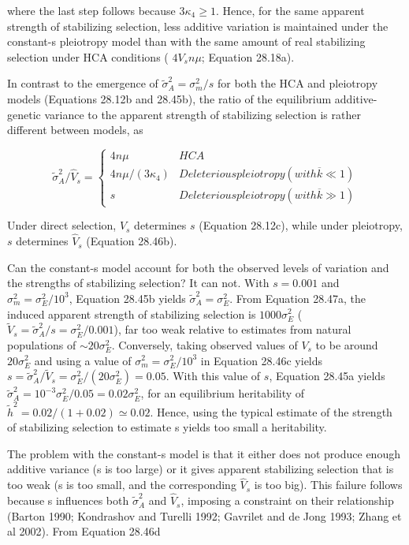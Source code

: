 \documentclass{article}
\begin{document}
where the last step follows because  $ 3\kappa_4 \geq 1 $. Hence, for the same apparent strength of stabilizing selection, less additive variation is maintained under the constant-s pleiotropy model than with the same amount of real stabilizing selection under HCA conditions ( $ 4V_s n\mu $; Equation 28.18a).

In contrast to the emergence of  $ \widetilde{\sigma}_A^2 = \sigma_m^2 / s $ for both the HCA and pleiotropy models (Equations 28.12b and 28.45b), the ratio of the equilibrium additive-genetic variance to the apparent strength of stabilizing selection is rather different between models, as

\begin{equation}
\widetilde{\sigma}_{A}^{2}/\widehat{V}_{s}=\begin{cases}4n\mu&HCA\\4n\mu/(3\kappa_{4})&Deleterious pleiotropy(with\overline{k}\ll1)\\s&Deleterious pleiotropy(with\overline{k}\gg1)\end{cases}
\tag{28.47a}
\label{eq:28_47a}
\end{equation}

Under direct selection,  $ V_s $ determines  $ s $ (Equation 28.12c), while under pleiotropy,  $ s $ determines  $ \widehat{V}_s $ (Equation 28.46b).

Can the constant-s model account for both the observed levels of variation and the strengths of stabilizing selection? It can not. With  $ s = 0.001 $ and  $ \sigma_m^2 = \sigma_E^2 / 10^3 $, Equation 28.45b yields  $ \tilde{\sigma}_A^2 = \sigma_E^2 $. From Equation 28.47a, the induced apparent strength of stabilizing selection is  $ 1000 \sigma_E^2 $ ( $ \tilde{V}_s = \tilde{\sigma}_A^2 / s = \sigma_E^2 / 0.001 $), far too weak relative to estimates from natural populations of  $ \sim 20 \sigma_E^2 $. Conversely, taking observed values of  $ V_s $ to be around  $ 20 \sigma_E^2 $ and using a value of  $ \sigma_m^2 = \sigma_E^2 / 10^3 $ in Equation 28.46c yields  $ s = \tilde{\sigma}_A^2 / \tilde{V}_s = \sigma_E^2 / (20 \sigma_E^2) = 0.05 $. With this value of  $ s $, Equation 28.45a yields  $ \tilde{\sigma}_A^2 = 10^{-3} \sigma_E^2 / 0.05 = 0.02 \sigma_E^2 $, for an equilibrium heritability of  $ \tilde{h}^2 = 0.02 / (1 + 0.02) \simeq 0.02 $. Hence, using the typical estimate of the strength of stabilizing selection to estimate s yields too small a heritability.

The problem with the constant-s model is that it either does not produce enough additive variance (s is too large) or it gives apparent stabilizing selection that is too weak (s is too small, and the corresponding  $ \hat{V}_s $ is too big). This failure follows because s influences both  $ \widetilde{\sigma}_A^2 $ and  $ \widehat{V}_s $, imposing a constraint on their relationship (Barton 1990; Kondrashov and Turelli 1992; Gavrilet and de Jong 1993; Zhang et al 2002). From Equation 28.46d
\end{document}
